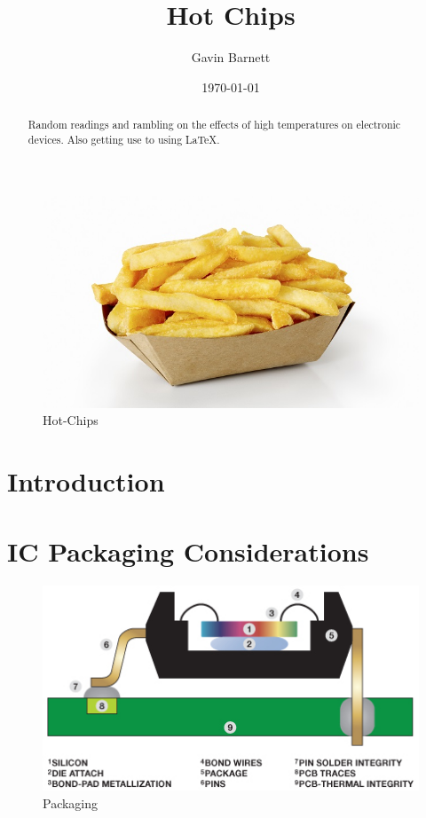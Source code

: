 \documentclass{article}
\title{Hot Chips}
\author{Gavin Barnett}
\date{\today}
\begin{document}
\maketitle
	\begin{figure}[h]
		\centering
		\includegraphics[scale=2.3]{Hot-chips-Getty}
		\caption{Hot-Chips}
	\end{figure}
\begin{abstract}
Random readings and rambling on the effects of high temperatures on electronic devices. 
Also getting use to using LaTeX.

\end{abstract}
\maketitle

\newpage

\tableofcontents

\newpage

\section{Introduction}

\newpage


\section{IC Packaging Considerations}
	\begin{figure}[h]
		\centering
		\includegraphics[scale=1]{Package_Breakdown}
		\caption{Packaging}
		\label{fig:packaging}
	\end{figure}
	
\end{document}
